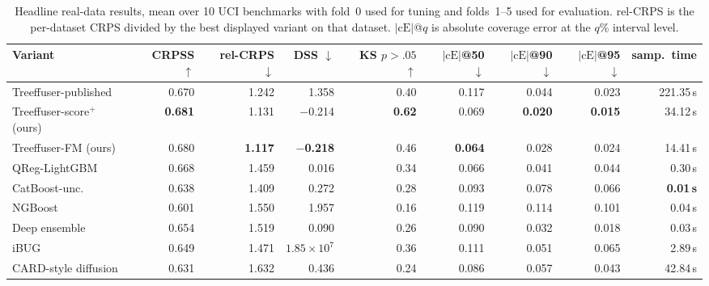 \documentclass{uai2026}
\begin{document}
\begin{table}[!t]
  \centering
  \caption{Headline real-data results, mean over 10 UCI benchmarks with fold~0 used for tuning and folds~1--5 used for evaluation. rel-CRPS is the per-dataset CRPS divided by the best displayed variant on that dataset. $|\text{cE}|$@$q$ is absolute coverage error at the $q$\% interval level.}\label{tab:headline}
  \scriptsize
  \begin{tabular}{lrrrrrrrr}
    \toprule
    Variant & CRPSS $\uparrow$ & rel-CRPS $\downarrow$ & DSS $\downarrow$ & KS $p{>}.05$ $\uparrow$ & $|\text{cE}|$@50 $\downarrow$ & $|\text{cE}|$@90 $\downarrow$ & $|\text{cE}|$@95 $\downarrow$ & samp.\ time \\
    \midrule
    Treeffuser-published & 0.670 & 1.242 & 1.358 & 0.40 & 0.117 & 0.044 & 0.023 & 221.35\,s \\
    Treeffuser-score$^+$ (ours) & \textbf{0.681} & 1.131 & $-$0.214 & \textbf{0.62} & 0.069 & \textbf{0.020} & \textbf{0.015} & 34.12\,s \\
    Treeffuser-FM (ours) & 0.680 & \textbf{1.117} & \textbf{$-$0.218} & 0.46 & \textbf{0.064} & 0.028 & 0.024 & 14.41\,s \\
    \midrule
    QReg-LightGBM & 0.668 & 1.459 & 0.016 & 0.34 & 0.066 & 0.041 & 0.044 & 0.30\,s \\
    CatBoost-unc. & 0.638 & 1.409 & 0.272 & 0.28 & 0.093 & 0.078 & 0.066 & \textbf{0.01\,s} \\
    NGBoost & 0.601 & 1.550 & 1.957 & 0.16 & 0.119 & 0.114 & 0.101 & 0.04\,s \\
    Deep ensemble & 0.654 & 1.519 & 0.090 & 0.26 & 0.090 & 0.032 & 0.018 & 0.03\,s \\
    iBUG & 0.649 & 1.471 & $1.85{\times}10^7$ & 0.36 & 0.111 & 0.051 & 0.065 & 2.89\,s \\
    CARD-style diffusion & 0.631 & 1.632 & 0.436 & 0.24 & 0.086 & 0.057 & 0.043 & 42.84\,s \\
    \bottomrule
  \end{tabular}
\end{table}
\end{document}
